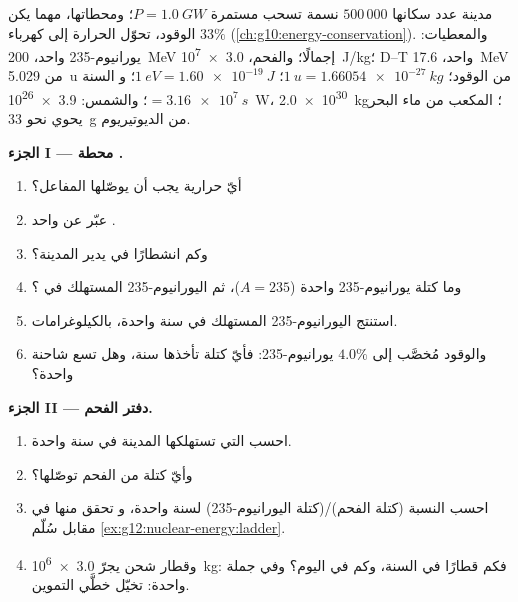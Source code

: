 \begin{problem}
\label{pb:g12:nuclear-energy:1}
مدينة عدد سكانها $500\,000$ نسمة تسحب  مستمرة
$P = \qty{1.0}{GW}$؛ ومحطاتها، مهما يكن الوقود، تحوّل الحرارة إلى
كهرباء  $33\%$ (\cref{ch:g10:energy-conservation}).
والمعطيات:  يورانيوم-235 واحد، \qty{200}{MeV} إجمالًا؛ والفحم، \qty{3.0e7}{J/kg}؛
 D--T واحد، \qty{17.6}{MeV} من \qty{5.029}{u} من الوقود؛
$\qty{1}{u} = \qty{1.66054e-27}{kg}$؛ $\qty{1}{eV} = \qty{1.60e-19}{J}$؛ و
السنة $= \qty{3.16e7}{s}$؛ والشمس: \qty{3.9e26}{W}، \qty{2.0e30}{kg}؛ 
المكعب من ماء البحر يحوي نحو \qty{33}{g} من الديوتيريوم.

\medskip
\noindent\textbf{الجزء I --- محطة .}
\begin{enumerate}
  \item أيّ  حرارية يجب أن يوصّلها المفاعل؟
  \item عبّر عن   واحد .
  \item وكم انشطارًا في  يدير المدينة؟
  \item وما كتلة  يورانيوم-235 واحدة ($A = 235$)، ثم اليورانيوم-235
        المستهلك في ؟
  \item استنتج اليورانيوم-235 المستهلك في سنة واحدة، بالكيلوغرامات.
  \item والوقود مُخصَّب إلى $4.0\%$ يورانيوم-235: فأيّ كتلة تأخذها سنة،
        وهل تسع شاحنة واحدة؟
\end{enumerate}

\medskip
\noindent\textbf{الجزء II --- دفتر الفحم.}
\begin{enumerate}[resume]
  \item احسب  التي تستهلكها المدينة في سنة واحدة.
  \item وأيّ كتلة من الفحم توصّلها؟
  \item احسب النسبة (كتلة الفحم)/(كتلة اليورانيوم-235) لسنة واحدة، و
        تحقق منها في مقابل سُلّم \cref{ex:g12:nuclear-energy:ladder}.
  \item وقطار شحن يجرّ \qty{3.0e6}{kg}: فكم قطارًا في السنة، وكم
        في اليوم؟ وفي جملة واحدة: تخيّل خطَّي التموين.
\end{enumerate}


\end{problem}
